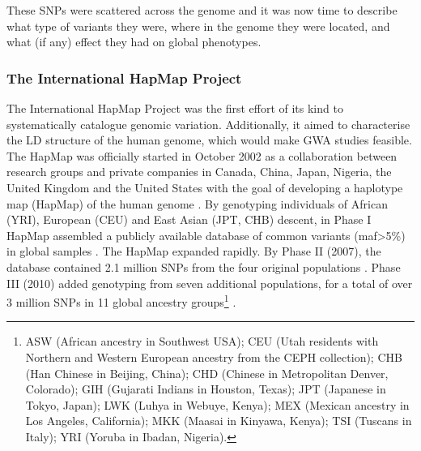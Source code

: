 These SNPs were scattered across the genome and it was now time to describe what type of variants they were, where in the genome they were located, and what (if any) effect they had on global phenotypes.

\subsubsection{The International HapMap Project}

The International HapMap Project was the first effort of its kind to systematically catalogue genomic variation. 
Additionally, it aimed to characterise the LD structure of the human genome, which would make GWA studies feasible. 
The HapMap was officially started in October 2002 as a collaboration between research groups and private companies in Canada, China, Japan, Nigeria, the United Kingdom and the United States with the goal of developing a haplotype map (HapMap) of the human genome \cite{international2003international}.
By genotyping individuals of African (YRI), European (CEU) and East Asian (JPT, CHB) descent, in Phase I HapMap assembled a publicly available database of common variants (\gls{maf}>5\%) in global samples \cite{international2005haplotype}. 
The HapMap expanded rapidly. 
By Phase II (2007), the database contained 2.1 million SNPs from the four original populations \cite{international2007second}.
Phase III (2010) added genotyping from seven additional populations, for a total of over 3 million SNPs in 11 global ancestry groups\footnote{ASW (African ancestry in Southwest USA); CEU (Utah residents with Northern and Western European ancestry from the CEPH collection); CHB (Han Chinese in Beijing, China); CHD (Chinese in Metropolitan Denver, Colorado); GIH (Gujarati Indians in Houston, Texas); JPT (Japanese in Tokyo, Japan); LWK (Luhya in Webuye, Kenya); MEX (Mexican ancestry in Los Angeles, California); MKK (Maasai in Kinyawa, Kenya); TSI (Tuscans in Italy); YRI (Yoruba in Ibadan, Nigeria).} \cite{international2010integrating}.\\ 




